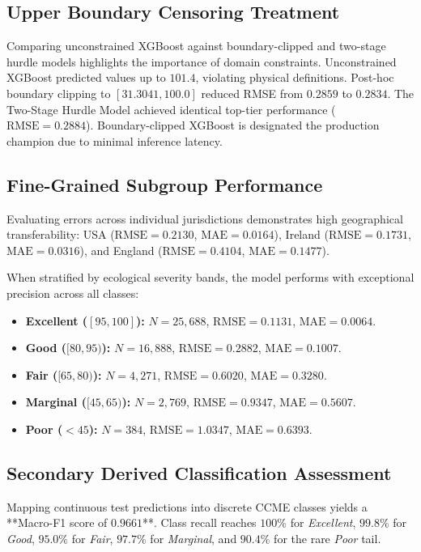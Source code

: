\documentclass[journal,10pt,twocolumn]{IEEEtran}
\begin{document}
\subsection{Upper Boundary Censoring Treatment}
Comparing unconstrained XGBoost against boundary-clipped and two-stage hurdle models highlights the importance of domain constraints. Unconstrained XGBoost predicted values up to $101.4$, violating physical definitions. Post-hoc boundary clipping to $[31.3041, 100.0]$ reduced RMSE from $0.2859$ to $0.2834$. The Two-Stage Hurdle Model achieved identical top-tier performance ($\text{RMSE} = 0.2884$). Boundary-clipped XGBoost is designated the production champion due to minimal inference latency.

\subsection{Fine-Grained Subgroup Performance}
Evaluating errors across individual jurisdictions demonstrates high geographical transferability: USA ($\text{RMSE} = 0.2130$, $\text{MAE} = 0.0164$), Ireland ($\text{RMSE} = 0.1731$, $\text{MAE} = 0.0316$), and England ($\text{RMSE} = 0.4104$, $\text{MAE} = 0.1477$).

When stratified by ecological severity bands, the model performs with exceptional precision across all classes:
\begin{itemize}
    \item \textbf{Excellent ($[95, 100]$):} $N=25,688$, $\text{RMSE} = 0.1131$, $\text{MAE} = 0.0064$.
    \item \textbf{Good ($[80, 95)$):} $N=16,888$, $\text{RMSE} = 0.2882$, $\text{MAE} = 0.1007$.
    \item \textbf{Fair ($[65, 80)$):} $N=4,271$, $\text{RMSE} = 0.6020$, $\text{MAE} = 0.3280$.
    \item \textbf{Marginal ($[45, 65)$):} $N=2,769$, $\text{RMSE} = 0.9347$, $\text{MAE} = 0.5607$.
    \item \textbf{Poor ($<45$):} $N=384$, $\text{RMSE} = 1.0347$, $\text{MAE} = 0.6393$.
\end{itemize}

\subsection{Secondary Derived Classification Assessment}
Mapping continuous test predictions into discrete CCME classes yields a **Macro-F1 score of $0.9661$**. Class recall reaches $100\%$ for \textit{Excellent}, $99.8\%$ for \textit{Good}, $95.0\%$ for \textit{Fair}, $97.7\%$ for \textit{Marginal}, and $90.4\%$ for the rare \textit{Poor} tail.
\end{document}
